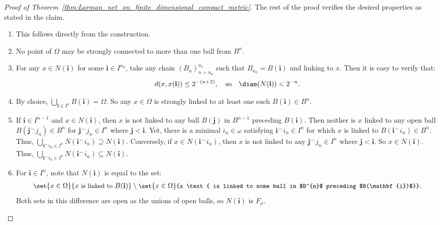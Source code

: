 \begin{proof}[Proof of Theorem~\ref{thm:Larman_net_on_finite_dimensional_compact_metric}]
    The rest of the proof verifies the desired properties as stated in the claim. 
    \begin{enumerate}[label=(\roman*)]
        \item This follows directly from the construction.
        \item No point of $\Omega$ may be strongly connected to more than one ball from $B^n$. 
        \item For any $x \in N(\mathbf{i})$ for some $\mathbf{i} \in I^{n_0}$, take any chain $(B_n)_{n = n_0}^{n_1}$ such that $B_{n_0} = B(\mathbf{i})$ and linking to $x$. Then it is easy to verify that:
        \begin{align*}
            d(x, x(\mathbf{i})) \leq 2^{-(n + 2)}, \quad \text{so} \quad \diam(N(\mathbf{i})) < 2^{-n}.
        \end{align*}
        \item By choice, $\bigcup_{\mathbf{i} \in I^n} B(\mathbf{i}) = \Omega$. So any $x \in \Omega$ is strongly linked to at least one such $B(\mathbf{i}) \in B^n$.
        \item If $\mathbf{i} \in I^{n - 1}$ and $x \in N(\mathbf{i})$, then $x$ is not linked to any ball $B(\mathbf{j})$ in $B^{n - 1}$ preceding $B(\mathbf{i})$. Then neither is $x$ linked to any open ball $B(\mathbf{j} ^\frown j_n) \in B^n$ for $\mathbf{j} ^\frown j_n \in I^n$ where $\mathbf{j} < \mathbf{i}$. Yet, there is a minimal $i_n \in \omega$ satisfying $\mathbf{i} ^\frown i_n \in I^n$ for which $x$ is linked to $B(\mathbf{i} ^\frown i_n) \in B^n$. Thus, $\bigcup_{\mathbf{i} ^\frown i_n \in I^n} N(\mathbf{i} ^\frown i_n) \supseteq N(\mathbf{i})$. Conversely, if $x \in N(\mathbf{i} ^\frown i_n)$, then $x$ is not linked to any $\mathbf{j}^\frown j_n \in I^n$ where $\mathbf{j} < \mathbf{i}$. So $x \in N(\mathbf{i})$. Thus, $\bigcup_{\mathbf{i} ^\frown i_n \in I^n} N(\mathbf{i} ^\frown i_n) \subseteq N(\mathbf{i})$.
        \item For $\mathbf{i} \in I^n$, note that $N(\mathbf{i})$ is equal to the set:
        \begin{align*}
            \small 
             \set{x \in \Omega}{x \text{ is linked to } B(\mathbf{i})} \setminus \set{x \in \Omega}{x \text{ is linked to some ball in $B^{n}$ preceding $B(\mathbf{i})$}}.
        \end{align*}
        Both sets in this difference are open as the unions of open balls, so $N(\mathbf{i})$ is $F_\sigma$.

\end{enumerate}
\end{proof}
